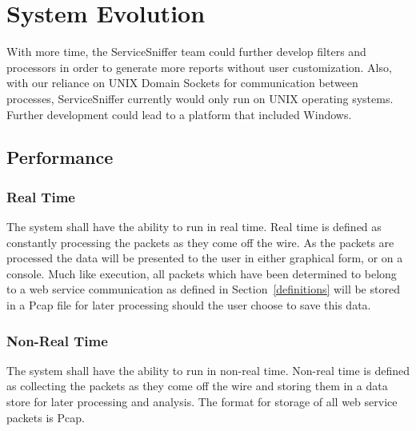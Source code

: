 \documentclass[titlepage]{article}
\begin{document}
\section{System Evolution}

With more time, the ServiceSniffer team could further develop filters and
processors in order to generate more reports without user customization.  Also,
with our reliance on UNIX Domain Sockets for communication between processes,
ServiceSniffer currently would only run on UNIX operating systems.  Further
development could lead to a platform that included Windows.


\subsection{Performance%
    \label{performance}%
}


\subsubsection{Real Time}\label{realtime} 
The system shall have the ability to run in real time. Real time is defined as
constantly processing the packets as they come off the wire. As the packets are
processed the data will be presented to the user in either graphical form, or
on a console.  Much like  execution, all packets which
have been determined to belong to a web service communication as defined in
Section~\ref{definitions} will be stored in a Pcap file for later processing
should the user choose to save this data.


\subsubsection{Non-Real Time}\label{nonrealtime}
The system shall have the ability to run in non-real time. Non-real time is
defined as collecting the packets as they come off the wire and storing them in
a data store for later processing and analysis.  The format for storage of all  
web service packets is Pcap.

\end{document}
